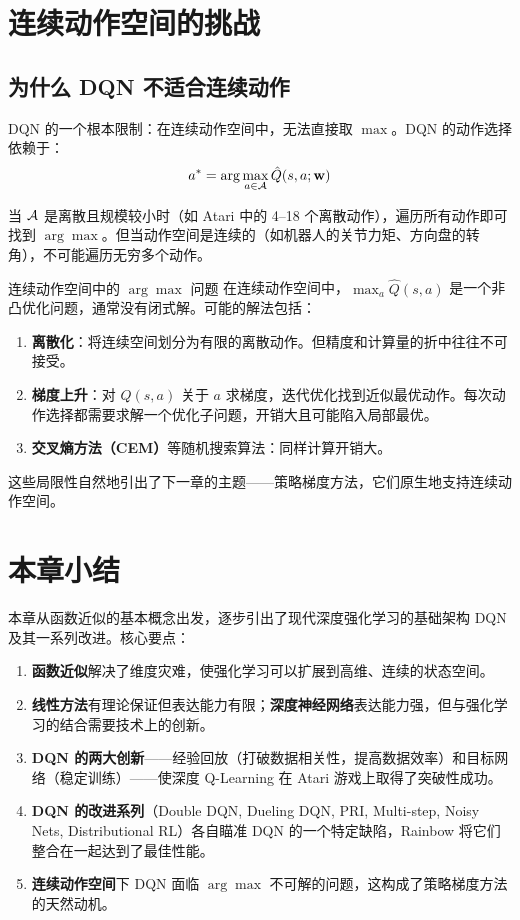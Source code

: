 \section{连续动作空间的挑战}

\subsection{为什么 DQN 不适合连续动作}

DQN 的一个根本限制：在连续动作空间中，无法直接取 $\max$。DQN 的动作选择依赖于：
$$a^* = \arg\max_{a \in \mathcal{A}} \hat{Q}(s, a; \mathbf{w})$$

当 $\mathcal{A}$ 是离散且规模较小时（如 Atari 中的 4--18 个离散动作），遍历所有动作即可找到 $\arg\max$。但当动作空间是连续的（如机器人的关节力矩、方向盘的转角），不可能遍历无穷多个动作。

\begin{mydefinition}{连续动作空间中的 $\arg\max$ 问题}
在连续动作空间中，$\max_{a} \hat{Q}(s,a)$ 是一个非凸优化问题，通常没有闭式解。可能的解法包括：
\begin{enumerate}
    \item \textbf{离散化}：将连续空间划分为有限的离散动作。但精度和计算量的折中往往不可接受。
    \item \textbf{梯度上升}：对 $\hat{Q}(s,a)$ 关于 $a$ 求梯度，迭代优化找到近似最优动作。每次动作选择都需要求解一个优化子问题，开销大且可能陷入局部最优。
    \item \textbf{交叉熵方法（CEM）}等随机搜索算法：同样计算开销大。
\end{enumerate}
\end{mydefinition}

这些局限性自然地引出了下一章的主题——策略梯度方法，它们原生地支持连续动作空间。

\section{本章小结}

本章从函数近似的基本概念出发，逐步引出了现代深度强化学习的基础架构 DQN 及其一系列改进。核心要点：

\begin{enumerate}
    \item \textbf{函数近似}解决了维度灾难，使强化学习可以扩展到高维、连续的状态空间。
    \item \textbf{线性方法}有理论保证但表达能力有限；\textbf{深度神经网络}表达能力强，但与强化学习的结合需要技术上的创新。
    \item \textbf{DQN 的两大创新}——经验回放（打破数据相关性，提高数据效率）和目标网络（稳定训练）——使深度 Q-Learning 在 Atari 游戏上取得了突破性成功。
    \item \textbf{DQN 的改进系列}（Double DQN, Dueling DQN, PRI, Multi-step, Noisy Nets, Distributional RL）各自瞄准 DQN 的一个特定缺陷，Rainbow 将它们整合在一起达到了最佳性能。
    \item \textbf{连续动作空间}下 DQN 面临 $\arg\max$ 不可解的问题，这构成了策略梯度方法的天然动机。
\end{enumerate}

